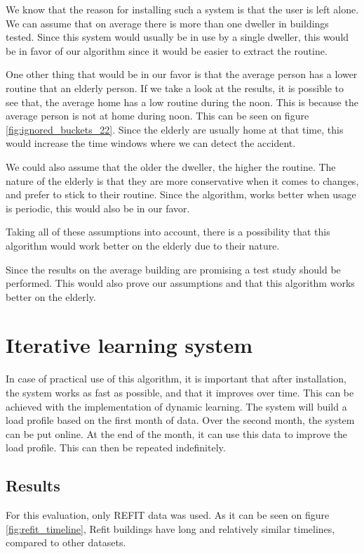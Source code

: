 We know that the reason for installing such a system is that the user is left alone.
We can assume that on average there is more than one dweller in buildings tested.
Since this system would usually be in use by a single dweller,
this would be in favor of our algorithm since it would be 
easier to extract the routine.

One other thing that would be in our favor is that the average person has a lower routine that an elderly person. 
If we take a look at the results, it is possible to see that,
the average home has a low routine during the noon. 
This is because the average person is not at home during noon.
This can be seen on figure \ref{fig:ignored_buckets_22}.
Since the elderly are usually home at that time, this would 
increase the time windows where we can detect the accident.

We could also assume that the older the dweller, the higher the routine. 
The nature of the elderly is that they are more conservative when it comes to changes, and prefer to stick to their routine.
Since the algorithm, works better when usage is periodic, this would also be in our favor. 

Taking all of these assumptions into account, 
there is a possibility that this algorithm would work 
better on the elderly due to their nature.

Since the results on the average building are promising
a test study should be performed. 
This would also prove our assumptions and that this algorithm works 
better on the elderly.

\section{Iterative learning system}

In case of practical use of this algorithm, it is 
important that after installation, the system works as fast as possible,
and that it improves over time. 
This can be achieved with the implementation of dynamic learning.
The system will build a load profile based on the first month of data.
Over the second month, the system can be put online.
At the end of the month, it can use this data to improve the load profile.
This can then be repeated indefinitely. 

\subsection{Results}

For this evaluation, only REFIT data was used. 
As it can be seen on figure \ref{fig:refit_timeline},
Refit buildings have long and relatively similar timelines,
compared to other datasets.


